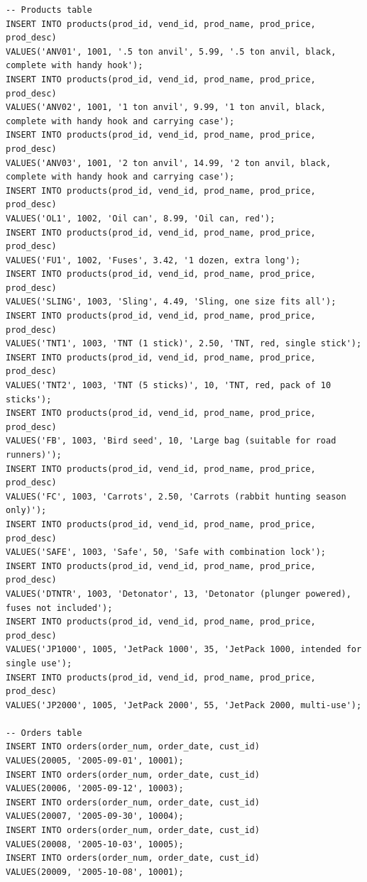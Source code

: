 \begin{enumerate}
\begin{center}
\begin{verbatim}
-- Products table
INSERT INTO products(prod_id, vend_id, prod_name, prod_price, prod_desc)
VALUES('ANV01', 1001, '.5 ton anvil', 5.99, '.5 ton anvil, black, complete with handy hook');
INSERT INTO products(prod_id, vend_id, prod_name, prod_price, prod_desc)
VALUES('ANV02', 1001, '1 ton anvil', 9.99, '1 ton anvil, black, complete with handy hook and carrying case');
INSERT INTO products(prod_id, vend_id, prod_name, prod_price, prod_desc)
VALUES('ANV03', 1001, '2 ton anvil', 14.99, '2 ton anvil, black, complete with handy hook and carrying case');
INSERT INTO products(prod_id, vend_id, prod_name, prod_price, prod_desc)
VALUES('OL1', 1002, 'Oil can', 8.99, 'Oil can, red');
INSERT INTO products(prod_id, vend_id, prod_name, prod_price, prod_desc)
VALUES('FU1', 1002, 'Fuses', 3.42, '1 dozen, extra long');
INSERT INTO products(prod_id, vend_id, prod_name, prod_price, prod_desc)
VALUES('SLING', 1003, 'Sling', 4.49, 'Sling, one size fits all');
INSERT INTO products(prod_id, vend_id, prod_name, prod_price, prod_desc)
VALUES('TNT1', 1003, 'TNT (1 stick)', 2.50, 'TNT, red, single stick');
INSERT INTO products(prod_id, vend_id, prod_name, prod_price, prod_desc)
VALUES('TNT2', 1003, 'TNT (5 sticks)', 10, 'TNT, red, pack of 10 sticks');
INSERT INTO products(prod_id, vend_id, prod_name, prod_price, prod_desc)
VALUES('FB', 1003, 'Bird seed', 10, 'Large bag (suitable for road runners)');
INSERT INTO products(prod_id, vend_id, prod_name, prod_price, prod_desc)
VALUES('FC', 1003, 'Carrots', 2.50, 'Carrots (rabbit hunting season only)');
INSERT INTO products(prod_id, vend_id, prod_name, prod_price, prod_desc)
VALUES('SAFE', 1003, 'Safe', 50, 'Safe with combination lock');
INSERT INTO products(prod_id, vend_id, prod_name, prod_price, prod_desc)
VALUES('DTNTR', 1003, 'Detonator', 13, 'Detonator (plunger powered), fuses not included');
INSERT INTO products(prod_id, vend_id, prod_name, prod_price, prod_desc)
VALUES('JP1000', 1005, 'JetPack 1000', 35, 'JetPack 1000, intended for single use');
INSERT INTO products(prod_id, vend_id, prod_name, prod_price, prod_desc)
VALUES('JP2000', 1005, 'JetPack 2000', 55, 'JetPack 2000, multi-use');

-- Orders table
INSERT INTO orders(order_num, order_date, cust_id)
VALUES(20005, '2005-09-01', 10001);
INSERT INTO orders(order_num, order_date, cust_id)
VALUES(20006, '2005-09-12', 10003);
INSERT INTO orders(order_num, order_date, cust_id)
VALUES(20007, '2005-09-30', 10004);
INSERT INTO orders(order_num, order_date, cust_id)
VALUES(20008, '2005-10-03', 10005);
INSERT INTO orders(order_num, order_date, cust_id)
VALUES(20009, '2005-10-08', 10001);


\end{verbatim}
\end{center}
\end{enumerate}
